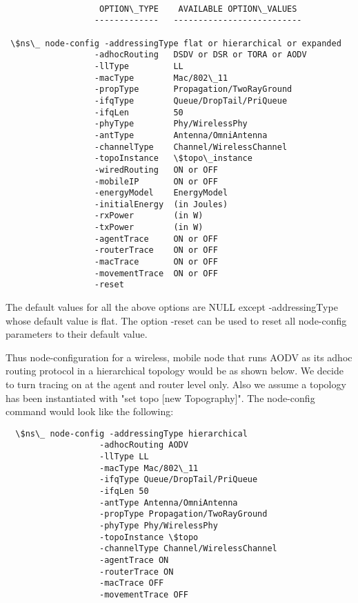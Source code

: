 \begin{verbatim}

                   OPTION\_TYPE    AVAILABLE OPTION\_VALUES
                  -------------   --------------------------

 \$ns\_ node-config -addressingType flat or hierarchical or expanded
                  -adhocRouting   DSDV or DSR or TORA or AODV
                  -llType         LL
                  -macType        Mac/802\_11
                  -propType       Propagation/TwoRayGround
                  -ifqType        Queue/DropTail/PriQueue
                  -ifqLen         50
                  -phyType        Phy/WirelessPhy
                  -antType        Antenna/OmniAntenna
                  -channelType    Channel/WirelessChannel
                  -topoInstance   \$topo\_instance
                  -wiredRouting   ON or OFF
                  -mobileIP       ON or OFF
                  -energyModel    EnergyModel
                  -initialEnergy  (in Joules)
                  -rxPower        (in W)
                  -txPower        (in W)
                  -agentTrace     ON or OFF
                  -routerTrace    ON or OFF
                  -macTrace       ON or OFF
                  -movementTrace  ON or OFF
                  -reset

\end{verbatim}

The default values for all the above options are NULL except -addressingType
whose default value is flat. The option -reset can be used to reset all
node-config parameters to their default value.

Thus node-configuration for a wireless, mobile node that runs AODV as its
adhoc routing protocol in a hierarchical topology would be as shown below.
We decide to turn tracing on at the agent and router level only. Also we 
assume a topology has been instantiated with "set topo [new Topography]". 
The node-config command would look like the following:

\begin{verbatim}
  \$ns\_ node-config -addressingType hierarchical
                   -adhocRouting AODV
                   -llType LL
                   -macType Mac/802\_11
                   -ifqType Queue/DropTail/PriQueue
                   -ifqLen 50
                   -antType Antenna/OmniAntenna
                   -propType Propagation/TwoRayGround
                   -phyType Phy/WirelessPhy
                   -topoInstance \$topo
                   -channelType Channel/WirelessChannel
                   -agentTrace ON
                   -routerTrace ON
                   -macTrace OFF
                   -movementTrace OFF
\end{verbatim}

